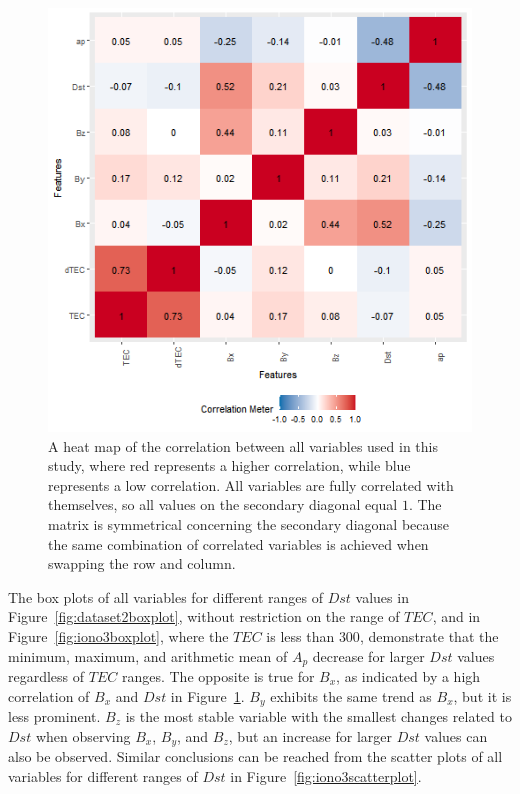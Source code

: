 \documentclass[sn-mathphys-num]{sn-jnl}%
\begin{document}
\begin{figure}
 \centering
 \includegraphics[width=0.9\linewidth]{correlation.png}
    \caption{A heat map of the correlation between all variables used in this study, where red represents a higher correlation, while blue represents a low correlation. All variables are fully correlated with themselves, so all values on the secondary diagonal equal $1$. The matrix is symmetrical concerning the secondary diagonal because the same combination of correlated variables is achieved when swapping the row and column.}
    \label{fig:correlation}
\end{figure}

The box plots of all variables for different ranges of $Dst$ values in Figure~\ref{fig:dataset2boxplot}, without restriction on the range of $TEC$, and in Figure~\ref{fig:iono3boxplot}, where the $TEC$ is less than $300$, demonstrate that the minimum, maximum, and arithmetic mean of $A_{p}$ decrease for larger $Dst$ values regardless of $TEC$ ranges. The opposite is true for $B_{x}$, as indicated by a high correlation of $B_{x}$ and $Dst$ in Figure~\ref{fig:correlation}. $B_{y}$ exhibits the same trend as $B_{x}$, but it is less prominent. $B_{z}$ is the most stable variable with the smallest changes related to $Dst$ when observing $B_{x}$, $B_{y}$, and $B_{z}$, but an increase for larger $Dst$ values can also be observed. Similar conclusions can be reached from the scatter plots of all variables for different ranges of $Dst$ in Figure~\ref{fig:iono3scatterplot}. 
\end{document}
